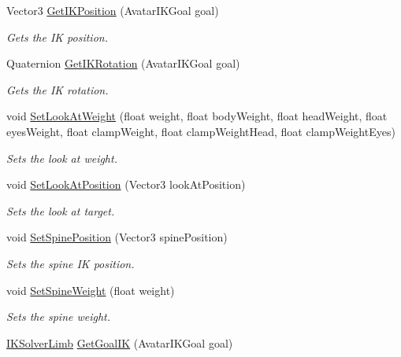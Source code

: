 \begin{DoxyCompactItemize}
Vector3 \mbox{\hyperlink{class_root_motion_1_1_final_i_k_1_1_biped_i_k_a1e446da70b9d2de7dce7d9587844bbd5}{Get\+I\+K\+Position}} (Avatar\+I\+K\+Goal goal)
\begin{DoxyCompactList}\small\item\em Gets the IK position. \end{DoxyCompactList}\item 
Quaternion \mbox{\hyperlink{class_root_motion_1_1_final_i_k_1_1_biped_i_k_a0b96941b5a4e0435d44a4aafbd738f53}{Get\+I\+K\+Rotation}} (Avatar\+I\+K\+Goal goal)
\begin{DoxyCompactList}\small\item\em Gets the IK rotation. \end{DoxyCompactList}\item 
void \mbox{\hyperlink{class_root_motion_1_1_final_i_k_1_1_biped_i_k_a5110bea33283809e72783248ae9f03ce}{Set\+Look\+At\+Weight}} (float weight, float body\+Weight, float head\+Weight, float eyes\+Weight, float clamp\+Weight, float clamp\+Weight\+Head, float clamp\+Weight\+Eyes)
\begin{DoxyCompactList}\small\item\em Sets the look at weight. \end{DoxyCompactList}\item 
void \mbox{\hyperlink{class_root_motion_1_1_final_i_k_1_1_biped_i_k_a4e679efc6cf5a4b4b53fd93c4432ac66}{Set\+Look\+At\+Position}} (Vector3 look\+At\+Position)
\begin{DoxyCompactList}\small\item\em Sets the look at target. \end{DoxyCompactList}\item 
void \mbox{\hyperlink{class_root_motion_1_1_final_i_k_1_1_biped_i_k_a083fc504cbd7966c125d0df387bd111d}{Set\+Spine\+Position}} (Vector3 spine\+Position)
\begin{DoxyCompactList}\small\item\em Sets the spine IK position. \end{DoxyCompactList}\item 
void \mbox{\hyperlink{class_root_motion_1_1_final_i_k_1_1_biped_i_k_a42e652485ff4fc1d1e0ec01814daca84}{Set\+Spine\+Weight}} (float weight)
\begin{DoxyCompactList}\small\item\em Sets the spine weight. \end{DoxyCompactList}\item 
\mbox{\hyperlink{class_root_motion_1_1_final_i_k_1_1_i_k_solver_limb}{I\+K\+Solver\+Limb}} \mbox{\hyperlink{class_root_motion_1_1_final_i_k_1_1_biped_i_k_a9dc41de7fb0b0d22edf7b5cb6a4b0b4b}{Get\+Goal\+IK}} (Avatar\+I\+K\+Goal goal)

\end{DoxyCompactItemize}
